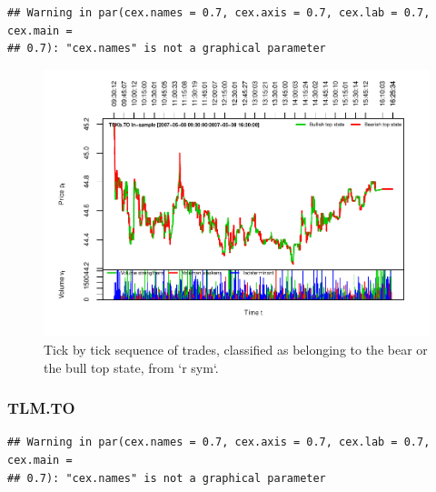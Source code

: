 \documentclass[]{article}
\begin{document}
\begin{verbatim}
## Warning in par(cex.names = 0.7, cex.axis = 0.7, cex.lab = 0.7, cex.main =
## 0.7): "cex.names" is not a graphical parameter
\end{verbatim}

\begin{figure}[H]
\includegraphics[width=\textwidth]{main_files/figure-latex/unnamed-chunk-46-1} \caption{Tick by tick sequence of trades, classified as belonging to the bear or the bull top state, from `r sym`.}\label{fig:unnamed-chunk-46}
\end{figure}

\newpage

\subsubsection{TLM.TO}\label{tlm.to}

\begin{verbatim}
## Warning in par(cex.names = 0.7, cex.axis = 0.7, cex.lab = 0.7, cex.main =
## 0.7): "cex.names" is not a graphical parameter
\end{verbatim}
\end{document}
